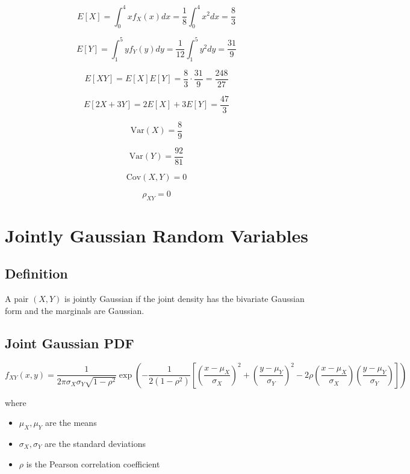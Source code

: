 \documentclass[12pt]{article}
\begin{document}
\[
E[X] = \int_0^4 x f_X(x) dx
= \frac18 \int_0^4 x^2 dx
= \frac83
\]

\[
E[Y] = \int_1^5 y f_Y(y) dy
= \frac1{12} \int_1^5 y^2 dy
= \frac{31}{9}
\]

\[
E[XY] = E[X]E[Y]
= \frac83 \cdot \frac{31}{9}
= \frac{248}{27}
\]

\[
E[2X+3Y] = 2E[X] + 3E[Y]
= \frac{47}{3}
\]

\[
\text{Var}(X) = \frac89
\]

\[
\text{Var}(Y) = \frac{92}{81}
\]

\[
\text{Cov}(X,Y) = 0
\]

\[
\rho_{XY} = 0
\]

\section{Jointly Gaussian Random Variables}

\subsection{Definition}

A pair $(X,Y)$ is jointly Gaussian if the joint density has the bivariate Gaussian form and the marginals are Gaussian.

\subsection{Joint Gaussian PDF}

\[
f_{XY}(x,y) =
\frac{1}{2\pi\sigma_X\sigma_Y\sqrt{1-\rho^2}}
\exp
\left(
-\frac{1}{2(1-\rho^2)}
\left[
\left(\frac{x-\mu_X}{\sigma_X}\right)^2
+
\left(\frac{y-\mu_Y}{\sigma_Y}\right)^2
-
2\rho
\left(\frac{x-\mu_X}{\sigma_X}\right)
\left(\frac{y-\mu_Y}{\sigma_Y}\right)
\right]
\right)
\]

where

\begin{itemize}
\item $\mu_X, \mu_Y$ are the means
\item $\sigma_X, \sigma_Y$ are the standard deviations
\item $\rho$ is the Pearson correlation coefficient
\end{itemize}
\end{document}
